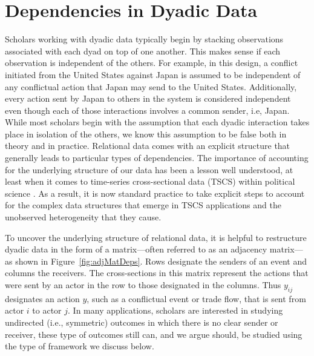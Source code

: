 \section{\textbf{Dependencies in Dyadic Data}}

Scholars working with dyadic data typically begin by stacking observations associated with each dyad on top of one another. This makes sense if each observation is independent of the others. For example, in this design, a conflict initiated from the United States against Japan is assumed to be independent of any conflictual action that Japan may send to the United States. Additionally, every action sent by Japan to others in the system is considered independent even though each of those interactions involves a common sender, i.e, Japan. While most scholars begin with the assumption that each dyadic interaction takes place in isolation of the others, we know this assumption to be false both in theory and in practice. Relational data comes with an explicit structure that generally leads to particular types of dependencies. The importance of accounting for the underlying structure of our data has been a lesson well understood, at least when it comes to time-series cross-sectional data (TSCS) within political science \citep{beck:katz:1995,beck:etal:1998}. As a result, it is now standard practice to take explicit steps to account for the complex data structures that emerge in TSCS applications and the unobserved heterogeneity that they cause. 

To uncover the underlying structure of relational data, it is helpful to restructure dyadic data in the form of a matrix---often referred to as an adjacency matrix---as shown in Figure~\ref{fig:adjMatDeps}. Rows designate the senders of an event and columns the receivers. The cross-sections in this matrix represent the actions that were sent by an actor in the row to those designated in the columns. Thus $y_{ij}$ designates an action $y$, such as a conflictual event or trade flow, that is sent from actor $i$ to actor $j$. In many applications, scholars are interested in studying undirected (i.e., symmetric) outcomes in which there is no clear sender or receiver, these type of outcomes still can, and we argue should, be studied using the type of framework we discuss below.

